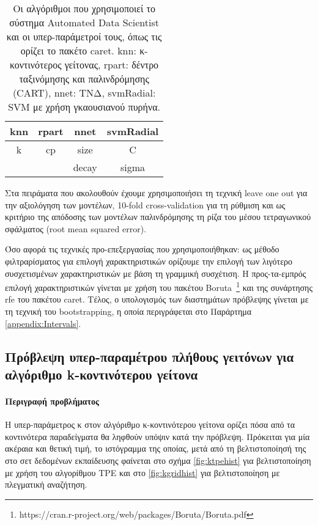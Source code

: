 	\begin{table}[!htb]
		\begin{center}
				\caption[Οι αλγόριθμοι που χρησιμοποιεί το σύστημα Automated Data Scientist και οι υπερ-παράμετροί του]{Οι αλγόριθμοι που χρησιμοποιεί το σύστημα Automated Data Scientist και οι υπερ-παράμετροί τους, όπως τις ορίζει το πακέτο caret. knn: κ-κοντινότερος γείτονας, rpart: δέντρο ταξινόμησης και παλινδρόμησης (CART), nnet: \gls{ΤΝΔ}, svmRadial: \gls{SVM} με χρήση γκαουσιανού πυρήνα.} \label{table:algorithms}
			\begin{tabular}{ |c|c|c|c| } 
				\hline
				knn & rpart & nnet & svmRadial \\
				\hline
			    k & cp & size& C \\
			     &  & decay& sigma  \\
				\hline
			\end{tabular}    
		\end{center}
		\label{table:algorithms}
	\end{table} 
	
Στα πειράματα που ακολουθούν έχουμε χρησιμοποιήσει τη τεχνική leave one out για την αξιολόγηση των μοντέλων, 10-fold cross-validation για τη ρύθμιση και ως κριτήριο της απόδοσης των μοντέλων παλινδρόμησης τη ρίζα του μέσου τετραγωνικού σφάλματος (root mean squared error).

Όσο αφορά τις τεχνικές προ-επεξεργασίας που χρησιμοποιήθηκαν: ως μέθοδο φιλτραρίσματος για επιλογή χαρακτηριστικών ορίζουμε την επιλογή των λιγότερο συσχετισμένων χαρακτηριστικών με βάση τη γραμμική συσχέτιση. Η προς-τα-εμπρός επιλογή χαρακτηριστικών γίνεται με χρήση του πακέτου Boruta~\footnote{https://cran.r-project.org/web/packages/Boruta/Boruta.pdf} και της συνάρτησης rfe του πακέτου caret. Τέλος, ο υπολογισμός των διαστημάτων πρόβλεψης γίνεται με τη τεχνική του bootstrapping, η οποία περιγράφεται στο Παράρτημα \ref{appendix:Intervals}.
 
\subsection{Πρόβλεψη υπερ-παραμέτρου πλήθους γειτόνων για αλγόριθμο k-κοντι\-νότερου γείτονα}

\paragraph{Περιγραφή προβλήματος} Η υπερ-παράμετρος κ στον αλγόριθμο κ-κοντινότερου γείτονα ορίζει πόσα από τα κοντινότερα παραδείγματα θα ληφθούν υπόψιν κατά την πρόβλεψη. Πρόκειται για μία ακέραια και θετική τιμή, το ιστόγραμμα της οποίας, μετά από τη βελτιστοποίησή της στο σετ δεδομένων εκπαίδευσης φαίνεται στο σχήμα  \ref{fig:ktpehist} για βελτιστοποίηση με χρήση του αλγορίθμου \gls{TPE} και στο \ref{fig:kgridhist} για βελτιστοποίηση με πλεγματική αναζήτηση.

